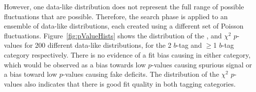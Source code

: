 However, one data-like distribution does not represent the full range of possible fluctuations that are possible.
Therefore, the search phase is applied to an ensemble of data-like distributions,
each created using a different set of Poisson fluctuations.
Figure~\ref{fig:pValueHists}  shows the distribution of
the \bh{}, \dhunt{} and $\chi^{2}$ \mbox{$p$-value}s for 200 different data-like distributions,
for the 2 $b$-tag and $\geq$1 $b$-tag category respectively.
There is no evidence of a fit bias causing in either category,
which would be observed as a bias towards low \bh{} \mbox{$p$-value}s causing spurious signal
or a bias toward low \dhunt{} \mbox{$p$-value}s causing fake deficits.
The distribution of the $\chi^{2}$ \mbox{$p$-value}s also indicates that there is good fit quality in both tagging categories.



